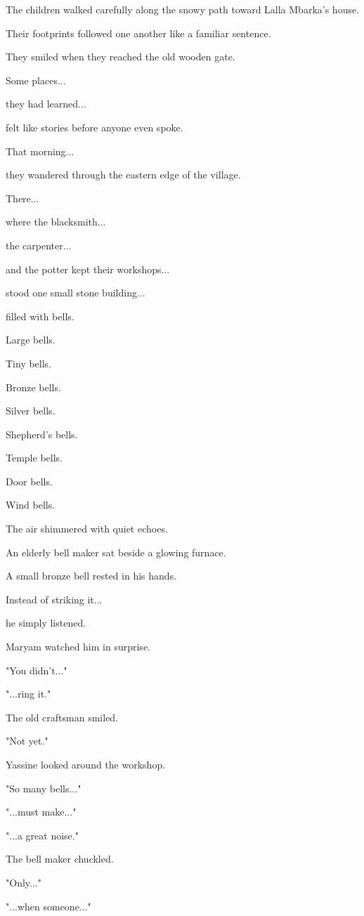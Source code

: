 \documentclass[12pt,openany]{book}
\begin{document}
The children walked carefully along the snowy path toward Lalla Mbarka's house.

Their footprints followed one another like a familiar sentence.

They smiled when they reached the old wooden gate.

Some places...

they had learned...

felt like stories before anyone even spoke.

That morning...

they wandered through the eastern edge of the village.

There...

where the blacksmith...

the carpenter...

and the potter kept their workshops...

stood one small stone building...

filled with bells.

Large bells.

Tiny bells.

Bronze bells.

Silver bells.

Shepherd's bells.

Temple bells.

Door bells.

Wind bells.

The air shimmered with quiet echoes.

An elderly bell maker sat beside a glowing furnace.

A small bronze bell rested in his hands.

Instead of striking it...

he simply listened.

Maryam watched him in surprise.

"You didn't..."

"...ring it."

The old craftsman smiled.

"Not yet."

Yassine looked around the workshop.

"So many bells..."

"...must make..."

"...a great noise."

The bell maker chuckled.

"Only..."

"...when someone..."
\end{document}
